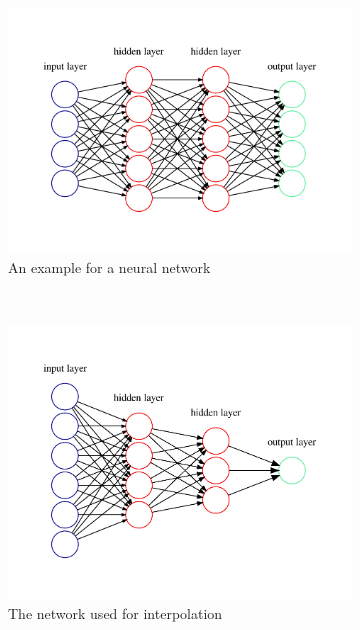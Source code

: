 \begin{figure}[h] %
	\centering
	\begin{subfigure}[t]{0.5\textwidth}
		\centering
		\includegraphics[width=\linewidth]{images/graphviz/general.pdf}
		\caption{An example for a neural network}
		\label{fig:neuralnetwork-general}
	\end{subfigure}%
	~ 
	\begin{subfigure}[t]{0.5\textwidth}
		\centering
		\includegraphics[width=\linewidth]{images/graphviz/graph.pdf}
		\caption{The network used for interpolation}
		\label{fig:neuralnetwork-graph}
	\end{subfigure}
	\caption{}
	
\end{figure}

